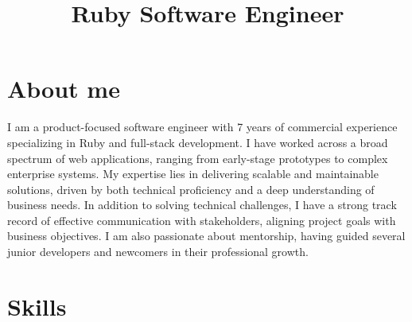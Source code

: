\documentclass[11pt,a4paper]{moderncv}
\title{Ruby Software Engineer}
\begin{document}
\maketitle

\section{About me}
I am a product-focused software engineer with 7 years of commercial experience specializing in Ruby and full-stack development. I have worked across a broad spectrum of web applications, ranging from early-stage prototypes to complex enterprise systems. My expertise lies in delivering scalable and maintainable solutions, driven by both technical proficiency and a deep understanding of business needs. In addition to solving technical challenges, I have a strong track record of effective communication with stakeholders, aligning project goals with business objectives. I am also passionate about mentorship, having guided several junior developers and newcomers in their professional growth.

\section{Skills}
\begin{cvcolumns}
\end{cvcolumns}
\end{document}
